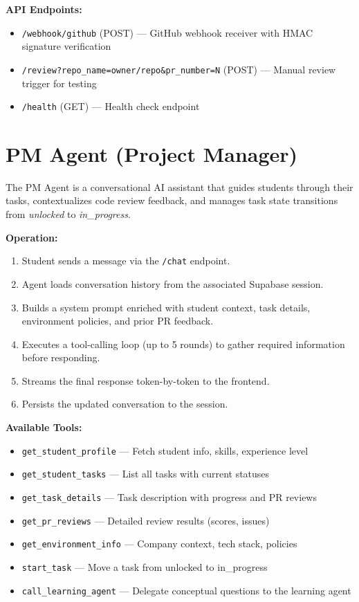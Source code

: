\documentclass[12pt,a4paper]{report}
\begin{document}
\noindent\textbf{API Endpoints:}
\begin{itemize}
    \item \texttt{/webhook/github} (POST) --- GitHub webhook receiver with HMAC signature verification
    \item \texttt{/review?repo\_name=owner/repo\&pr\_number=N} (POST) --- Manual review trigger for testing
    \item \texttt{/health} (GET) --- Health check endpoint
\end{itemize}

\section{PM Agent (Project Manager)}

The PM Agent is a conversational AI assistant that guides students through their tasks, contextualizes code review feedback, and manages task state transitions from \textit{unlocked} to \textit{in\_progress}.

\noindent\textbf{Operation:}
\begin{enumerate}
    \item Student sends a message via the \texttt{/chat} endpoint.
    \item Agent loads conversation history from the associated Supabase session.
    \item Builds a system prompt enriched with student context, task details, environment policies, and prior PR feedback.
    \item Executes a tool-calling loop (up to 5 rounds) to gather required information before responding.
    \item Streams the final response token-by-token to the frontend.
    \item Persists the updated conversation to the session.
\end{enumerate}

\noindent\textbf{Available Tools:}
\begin{itemize}
    \item \texttt{get\_student\_profile} --- Fetch student info, skills, experience level
    \item \texttt{get\_student\_tasks} --- List all tasks with current statuses
    \item \texttt{get\_task\_details} --- Task description with progress and PR reviews
    \item \texttt{get\_pr\_reviews} --- Detailed review results (scores, issues)
    \item \texttt{get\_environment\_info} --- Company context, tech stack, policies
    \item \texttt{start\_task} --- Move a task from unlocked to in\_progress
    \item \texttt{call\_learning\_agent} --- Delegate conceptual questions to the learning agent
\end{itemize}
\end{document}
